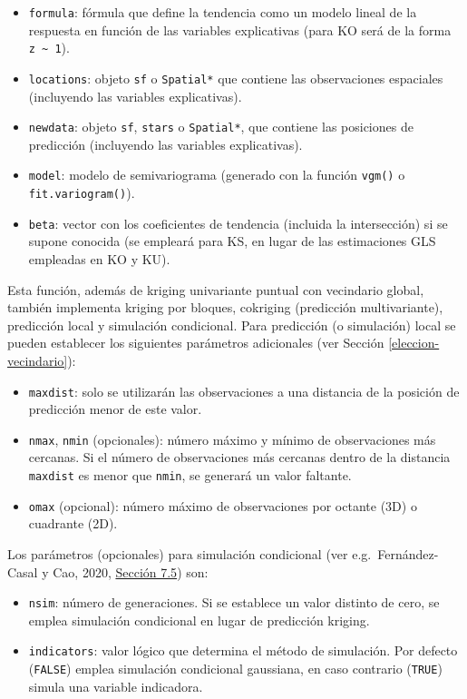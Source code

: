 \documentclass[
  spanish,
]{book}
\providecommand{\tightlist}{%
  \setlength{\itemsep}{0pt}\setlength{\parskip}{0pt}}
\theoremstyle{break}
\theoremstyle{definition}
\theoremstyle{definition}
\theoremstyle{definition}
\theoremstyle{definition}
\theoremstyle{remark}
\begin{document}
\begin{itemize}
\tightlist
\item
  \texttt{formula}: fórmula que define la tendencia como un modelo lineal de la respuesta en función de las variables explicativas (para KO será de la forma \texttt{z\ \textasciitilde{}\ 1}).
\item
  \texttt{locations}: objeto \texttt{sf} o \texttt{Spatial*} que contiene las observaciones espaciales (incluyendo las variables explicativas).
\item
  \texttt{newdata}: objeto \texttt{sf}, \texttt{stars} o \texttt{Spatial*}, que contiene las posiciones de predicción (incluyendo las variables explicativas).
\item
  \texttt{model}: modelo de semivariograma (generado con la función \texttt{vgm()} o \texttt{fit.variogram()}).
\item
  \texttt{beta}: vector con los coeficientes de tendencia (incluida la intersección) si se supone conocida (se empleará para KS, en lugar de las estimaciones GLS empleadas en KO y KU).
\end{itemize}

Esta función, además de kriging univariante puntual con vecindario global, también implementa kriging por bloques, cokriging (predicción multivariante), predicción local y simulación condicional.
Para predicción (o simulación) local se pueden establecer los siguientes parámetros adicionales (ver Sección \ref{eleccion-vecindario}):

\begin{itemize}
\tightlist
\item
  \texttt{maxdist}: solo se utilizarán las observaciones a una distancia de la posición de predicción menor de este valor.
\item
  \texttt{nmax}, \texttt{nmin} (opcionales): número máximo y mínimo de observaciones más cercanas. Si el número de observaciones más cercanas dentro de la distancia \texttt{maxdist} es menor que \texttt{nmin}, se generará un valor faltante.
\item
  \texttt{omax} (opcional): número máximo de observaciones por octante (3D) o cuadrante (2D).
\end{itemize}

Los parámetros (opcionales) para simulación condicional (ver e.g.~Fernández-Casal y Cao, 2020, \href{https://rubenfcasal.github.io/simbook/simulaci\%C3\%B3n-condicional-e-incondicional.html}{Sección 7.5}) son:

\begin{itemize}
\tightlist
\item
  \texttt{nsim}: número de generaciones. Si se establece un valor distinto de cero, se emplea simulación condicional en lugar de predicción kriging.
\item
  \texttt{indicators}: valor lógico que determina el método de simulación. Por defecto (\texttt{FALSE}) emplea simulación condicional gaussiana, en caso contrario (\texttt{TRUE}) simula una variable indicadora.
\end{itemize}
\end{document}
